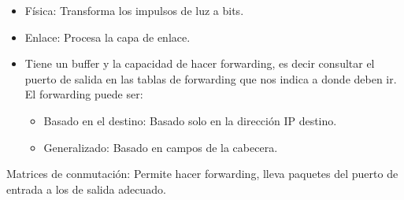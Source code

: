 \documentclass[12pt, twoside, openright]{report} %
\begin{document}
\begin{itemize}
	\item Física: Transforma los impulsos de luz a bits.
	\item Enlace: Procesa la capa de enlace.
	\item Tiene un buffer y la capacidad de hacer forwarding, es decir
	      consultar el puerto de salida en las tablas de forwarding que nos
	      indica a donde deben ir. El forwarding puede ser:

	      \begin{itemize}
		      \item Basado en el destino: Basado solo en la dirección IP destino.
		      \item Generalizado: Basado en campos de la cabecera.
	      \end{itemize}
\end{itemize}
\pagebreak
Matrices de conmutación: Permite hacer forwarding, lleva paquetes
del puerto de entrada a los de salida adecuado.
\end{document}
